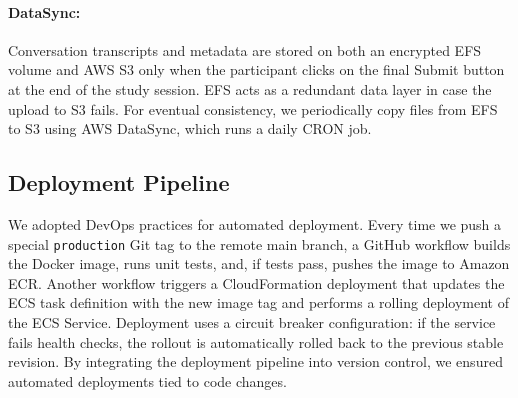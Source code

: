 \paragraph{DataSync:}Conversation transcripts and metadata are stored on both an encrypted EFS volume and AWS S3 only when the participant clicks on the final Submit button at the end of the study session. EFS acts as a redundant data layer in case the upload to S3 fails. For eventual consistency, we periodically copy files from EFS to S3 using AWS DataSync, which runs a daily CRON job.

\subsection{Deployment Pipeline}
We adopted DevOps practices for automated deployment. Every time we push a special \texttt{production} Git tag to the remote main branch, a GitHub workflow builds the Docker image, runs unit tests, and, if tests pass, pushes the image to Amazon ECR. Another workflow triggers a CloudFormation deployment that updates the ECS task definition with the new image tag and performs a rolling deployment of the ECS Service. Deployment uses a circuit breaker configuration: if the service fails health checks, the rollout is automatically rolled back to the previous stable revision. By integrating the deployment pipeline into version control, we ensured automated deployments tied to code changes.
